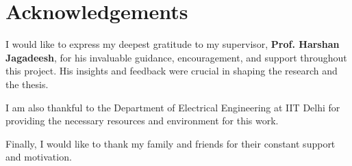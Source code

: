 \chapter*{Acknowledgements}
I would like to express my deepest gratitude to my supervisor, \textbf{Prof. Harshan Jagadeesh}, for his invaluable guidance, encouragement, and support throughout this project. His insights and feedback were crucial in shaping the research and the thesis.

I am also thankful to the Department of Electrical Engineering at IIT Delhi for providing the necessary resources and environment for this work. 

Finally, I would like to thank my family and friends for their constant support and motivation.
